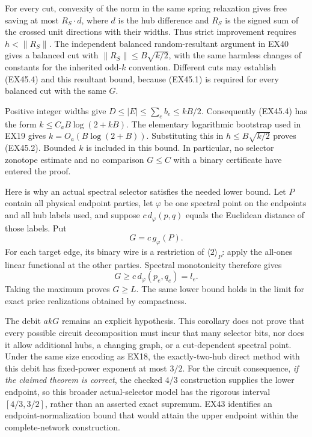 For every cut, convexity of the norm in the same spring relaxation
gives free saving at most $R_S\cdot d$, where $d$ is the hub
difference and $R_S$ is the signed sum of the crossed unit directions
with their widths. Thus strict improvement requires
$h<\|R_S\|$. The independent balanced random-resultant argument in
EX40 gives a balanced cut with
$\|R_S\|\le B\sqrt{k/2}$, with the same harmless changes of constants
for the inherited odd-$k$ convention. Different cuts may establish
(EX45.4) and this resultant bound, because (EX45.1) is required for
every balanced cut with the same $G$.

Positive integer widths give
$D\le |E|\le\sum_e b_e\le kB/2$. Consequently (EX45.4) has the
form $k\le C_a B\log(2+kB)$. The elementary logarithmic bootstrap
used in EX19 gives $k=O_a(B\log(2+B))$. Substituting this in
$h\le B\sqrt{k/2}$ proves (EX45.2). Bounded $k$ is included in this
bound. In particular, no selector zonotope estimate and no comparison
$G\le C$ with a binary certificate have entered the proof.

Here is why an actual spectral selector satisfies the needed lower
bound. Let $P$ contain all physical endpoint parties, let $\varphi$
be one spectral point on the endpoints and all hub labels used, and
suppose $c\,d_\varphi(p,q)$ equals the Euclidean distance of those
labels. Put
\[
                         G=c\,g_\varphi(P).
\]
For each target edge, its binary wire is a restriction of
$\langle2\rangle_P$: apply the all-ones linear functional at the
other parties. Spectral monotonicity therefore gives
\[
                   G\ge c\,d_\varphi(p_e,q_e)=l_e.
\]
Taking the maximum proves $G\ge L$. The same lower bound holds in
the limit for exact price realizations obtained by compactness.

The debit $akG$ remains an explicit hypothesis. This corollary does
not prove that every possible circuit decomposition must incur that
many selector bits, nor does it allow additional hubs, a changing
graph, or a cut-dependent spectral point. Under the same size encoding as EX18, the exactly-two-hub direct
method with this debit has fixed-power exponent at most $3/2$.
For the circuit consequence, \emph{if the claimed theorem is correct},
the checked $4/3$ construction supplies the lower endpoint,
so this broader actual-selector model has the rigorous interval
$[4/3,3/2]$, rather than an asserted exact supremum. EX43 identifies
an endpoint-normalization bound that would attain the upper endpoint
within the complete-network construction.


